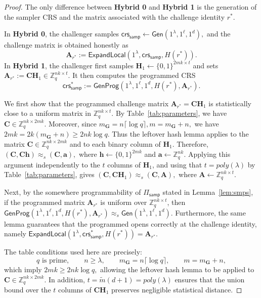 \noindent\begin{proof}
The only difference between \textbf{Hybrid 0} and \textbf{Hybrid 1} is the
generation of the sampler CRS and the matrix associated with the challenge
identity $r^\ast$.

In \textbf{Hybrid 0}, the challenger samples
$
    \mathsf{crs}_{\mathsf{samp}}
    \gets
    \mathsf{Gen}(1^\lambda,1^\ell,1^d),
$
and the challenge matrix is obtained honestly as
\[
    \mathbf A_{r^\ast}
    :=
    \mathsf{ExpandLocal}
    (1^\lambda,\mathsf{crs}_{\mathsf{samp}},H(r^\ast)).
\]
In \textbf{Hybrid 1}, the challenger first samples
$
    \mathbf H_1 \gets \{0,1\}^{2mk\times t}
$
and sets
$
    \mathbf A_{r^\ast}:=\mathbf C\mathbf H_1
    \in \mathbb Z_q^{nk\times t}.
$
It then computes the programmed CRS
\[
    \mathsf{crs}_{\mathsf{samp}}^\ast
    :=
    \mathsf{GenProg}
    (1^\lambda,1^\ell,1^d,H(r^\ast),\mathbf A_{r^\ast}).
\]

We first show that the programmed challenge matrix
$\mathbf A_{r^\ast}=\mathbf C\mathbf H_1$ is statistically close to a
uniform matrix in $\mathbb Z_q^{nk\times t}$. By Table~\ref{tab:parameters},
we have
$
    \mathbf C\in \mathbb Z_q^{nk\times 2mk}.
$
Moreover, since
$
    m_{\mathbf G}=n\lceil\log q\rceil,
    m=m_{\mathbf G}+n,
$
we have
$
    2mk
    =
    2k(m_{\mathbf G}+n)
    \ge
    2nk\log q.
$
Thus the leftover hash lemma applies to the matrix
$\mathbf C\in\mathbb Z_q^{nk\times 2mk}$ and to each binary column of
$\mathbf H_1$. Therefore,
$
    (\mathbf C,\mathbf C\mathbf h)
    \approx_s
    (\mathbf C,\mathbf a),
$
where $\mathbf h\gets\{0,1\}^{2mk}$ and
$\mathbf a\gets\mathbb Z_q^{nk}$. Applying this argument independently to
the $t$ columns of $\mathbf H_1$, and using that $t=poly(\lambda)$ by
Table~\ref{tab:parameters}, gives
$
    (\mathbf C,\mathbf C\mathbf H_1)
    \approx_s
    (\mathbf C,\mathbf A),
$
where
$
    \mathbf A\gets\mathbb Z_q^{nk\times t}.
$

Next, by the somewhere programmability of $\Pi_{\mathsf{samp}}$ stated in
Lemma~\ref{lem:smps}, if the programmed matrix
$\mathbf A_{r^\ast}$ is uniform over $\mathbb Z_q^{nk\times t}$, then
$
    \mathsf{GenProg}
    (1^\lambda,1^\ell,1^d,H(r^\ast),\mathbf A_{r^\ast})
    \approx_s
    \mathsf{Gen}(1^\lambda,1^\ell,1^d).
$
Furthermore, the same lemma guarantees that the programmed opens
correctly at the challenge identity, namely
$
    \mathsf{ExpandLocal}
    (1^\lambda,\mathsf{crs}_{\mathsf{samp}}^\ast,H(r^\ast))
    =
    \mathbf A_{r^\ast}.
$

The table conditions used here are precisely:
\[
    q \text{ is prime},\qquad
    n\ge \lambda,\qquad
    m_{\mathbf G}=n\lceil\log q\rceil,\qquad
    m=m_{\mathbf G}+n,
\]
which imply
$
    2mk\ge 2nk\log q,
$
allowing the leftover hash lemma to be applied to
$\mathbf C\in\mathbb Z_q^{nk\times 2mk}$. In addition,
$
    t=\widetilde m(d+1)=poly(\lambda)
$
ensures that the union bound over the $t$ columns of
$\mathbf C\mathbf H_1$ preserves negligible statistical distance.


\end{proof}
